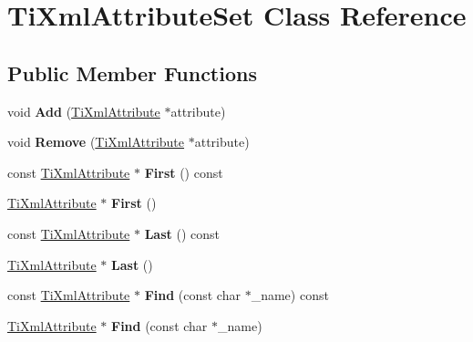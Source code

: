 \hypertarget{classTiXmlAttributeSet}{
\section{\-Ti\-Xml\-Attribute\-Set \-Class \-Reference}
\label{df/dda/classTiXmlAttributeSet}
}
\subsection*{\-Public \-Member \-Functions}
\begin{DoxyCompactItemize}
\item 
\hypertarget{classTiXmlAttributeSet_a745e50ddaae3bee93e4589321e0b9c1a}{
void {\bfseries \-Add} (\hyperlink{classTiXmlAttribute}{\-Ti\-Xml\-Attribute} $\ast$attribute)}
\label{df/dda/classTiXmlAttributeSet_a745e50ddaae3bee93e4589321e0b9c1a}

\item 
\hypertarget{classTiXmlAttributeSet_a924a73d071f2573f9060f0be57879c57}{
void {\bfseries \-Remove} (\hyperlink{classTiXmlAttribute}{\-Ti\-Xml\-Attribute} $\ast$attribute)}
\label{df/dda/classTiXmlAttributeSet_a924a73d071f2573f9060f0be57879c57}

\item 
\hypertarget{classTiXmlAttributeSet_ae0636e88cedd4b09d61c451860f68598}{
const \hyperlink{classTiXmlAttribute}{\-Ti\-Xml\-Attribute} $\ast$ {\bfseries \-First} () const }
\label{df/dda/classTiXmlAttributeSet_ae0636e88cedd4b09d61c451860f68598}

\item 
\hypertarget{classTiXmlAttributeSet_a99703bb08ca2aece2d7ef835de339ba0}{
\hyperlink{classTiXmlAttribute}{\-Ti\-Xml\-Attribute} $\ast$ {\bfseries \-First} ()}
\label{df/dda/classTiXmlAttributeSet_a99703bb08ca2aece2d7ef835de339ba0}

\item 
\hypertarget{classTiXmlAttributeSet_a7b3f3ccf39a97bc25539d3fcc540296a}{
const \hyperlink{classTiXmlAttribute}{\-Ti\-Xml\-Attribute} $\ast$ {\bfseries \-Last} () const }
\label{df/dda/classTiXmlAttributeSet_a7b3f3ccf39a97bc25539d3fcc540296a}

\item 
\hypertarget{classTiXmlAttributeSet_ab4c4edfb2d74f6ea31aae096743bd6e0}{
\hyperlink{classTiXmlAttribute}{\-Ti\-Xml\-Attribute} $\ast$ {\bfseries \-Last} ()}
\label{df/dda/classTiXmlAttributeSet_ab4c4edfb2d74f6ea31aae096743bd6e0}

\item 
\hypertarget{classTiXmlAttributeSet_aacbbc5e1a1c987e72815430e89fcb58b}{
const \hyperlink{classTiXmlAttribute}{\-Ti\-Xml\-Attribute} $\ast$ {\bfseries \-Find} (const char $\ast$\-\_\-name) const }
\label{df/dda/classTiXmlAttributeSet_aacbbc5e1a1c987e72815430e89fcb58b}

\item 
\hypertarget{classTiXmlAttributeSet_a2f210bed54c832adf1683c44c35727b9}{
\hyperlink{classTiXmlAttribute}{\-Ti\-Xml\-Attribute} $\ast$ {\bfseries \-Find} (const char $\ast$\-\_\-name)}
\label{df/dda/classTiXmlAttributeSet_a2f210bed54c832adf1683c44c35727b9}

\end{DoxyCompactItemize}


